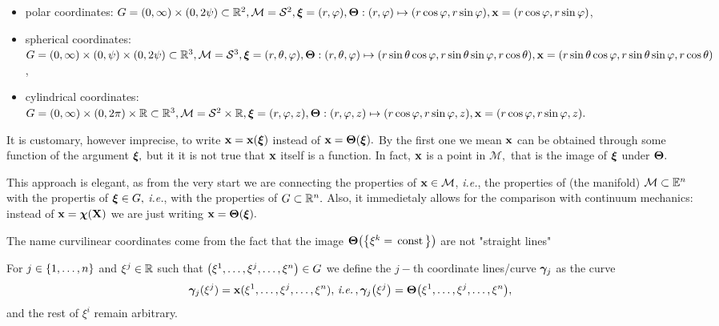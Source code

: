 \documentclass[../main.tex]{subfiles}
\begin{document}
\begin{example}
	\begin{itemize}
		\item polar coordinates: $G = \qty(0, \infty) \times \qty(0, 2 \psi) \subset {\mathbb R}^2, \mathcal{M} = \mathcal{S}^2, \vb*{\xi} = (r, \varphi), \vb*{\Theta}: \qty(r, \varphi) \mapsto (r \cos \varphi, r \sin \varphi), \vb{x} = \qty(r \cos \varphi, r \sin \varphi)$,
		\item spherical coordinates: $G = \qty(0, \infty) \times \qty(0, \psi) \times (0, 2 \psi) \subset {\mathbb R}^{3}, \mathcal{M} = \mathcal{S}^3, \vb*{\xi} = \qty(r, \theta, \varphi), \vb*{\Theta}: \qty(r, \theta, \varphi) \mapsto \qty(r \sin \theta \cos \varphi, r \sin \theta \sin \varphi, r \cos \theta), \vb{x} = \qty(r \sin \theta \cos \varphi, r \sin \theta \sin \varphi, r \cos \theta)$,
		\item cylindrical coordinates: $G = \qty(0, \infty) \times \qty(0, 2 \pi) \times {\mathbb R} \subset {\mathbb R}^{3}, \mathcal{M} = \mathcal{S}^2 \times {\mathbb R}, \vb*{\xi} = \qty(r, \varphi, z), \vb*{\Theta}: \qty(r, \varphi, z) \mapsto \qty(r \cos \varphi, r \sin \varphi, z), \vb{x} = \qty(r \cos \varphi, r \sin \varphi, z).$
	\end{itemize}
\end{example}
It is customary, however imprecise, to write $\vb{x} = \vb{x}\qty(\vb*{\xi})$ instead of $\vb{x} = \vb*{\Theta}\qty(\vb*{\xi}).$ By the first one we mean $\vb{x}$ can be obtained through some function of the argument $\vb*{\xi},$ but it it is not true that $\vb{x}$ itself is a function. In fact, $\vb{x}$ is a point in $\mathcal{M},$ that is the image of $\vb*{\xi}$ under $\vb*{\Theta}.$

This approach is elegant, as from the very start we are connecting the properties of $\vb{x} \in \mathcal{M}$, \textit{i.e.}, the properties of (the manifold) $\mathcal{M} \subset \mathbb{E}^n$ with the propertis of $\vb*{\xi} \in G,$ \textit{i.e.}, with the properties of $G \subset {\mathbb R}^{n}.$ Also, it immedietaly allows for the comparison with continuum mechanics: instead of $\vb{x} = \vb*{\chi}\qty(\vb{X})$ we are just writing $\vb{x} = \vb*{\Theta}\qty(\vb*{\xi}).$

\begin{remark}
	The name curvilinear coordinates come from the fact that the image $\vb*{\Theta}\qty(\qty{\xi^k = \, \text{const} \,})$ are not "straight lines"
\end{remark}

\begin{definition}
	For $j \in \qty{1, \dots, n}$ and $\xi^j \in {\mathbb R}$ such that $\qty(\xi^1, \dots, \xi^j, \dots, \xi^n) \in G$ we define the $j-$th coordinate lines/curve $\vb*{\gamma}_j$ as the curve
	\[
		\vb*{\gamma}_j(\xi^j) = \vb{x}(\xi^1,\dots,\xi^j,\dots,\xi^n), \, \text{\textit{i.e.}} \,, \vb*{\gamma}_j\qty(\xi^j) = \vb*{\Theta}\qty(\xi^1, \dots, \xi^j, \dots, \xi^n),
	\]
	and the rest of $\xi^i$ remain arbitrary.
\end{definition}
\end{document}
